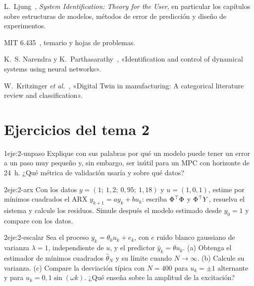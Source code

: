 \begin{lecturas}
\item L.~Ljung~\cite{ljung}, \emph{System Identification: Theory for the User}, en particular los capítulos sobre estructuras de modelos, métodos de error de predicción y diseño de experimentos.
\item MIT 6.435~\cite{mit6435}, temario y hojas de problemas.
\item K.~S. Narendra y K.~Parthasarathy~\cite{narendra}, «Identification and control of dynamical systems using neural networks».
\item W.~Kritzinger \emph{et al.}~\cite{kritzinger}, «Digital Twin in manufacturing: A categorical literature review and classification».
\end{lecturas}

\section*{Ejercicios del tema 2}

\begin{ejercicio}{1}{eje:2-unpaso}
Explique con sus palabras por qué un modelo puede tener un error a un paso muy pequeño y, sin embargo, ser inútil para un MPC con horizonte de 24~h. ¿Qué métrica de validación usaría y sobre qué datos?
\end{ejercicio}

\begin{ejercicio}{2}{eje:2-arx}
Con los datos $y=(1;\ 1{,}2;\ 0{,}95;\ 1{,}18)$ y $u=(1,0,1)$, estime por mínimos cuadrados el ARX $y_{k+1}=ay_k+bu_k$: escriba $\Phi^{\top}\Phi$ y $\Phi^{\top} Y$, resuelva el sistema y calcule los residuos. Simule después el modelo estimado desde $y_0=1$ y compare con los datos.
\end{ejercicio}

\begin{ejercicio}{2}{eje:2-escalar}
Sea el proceso $y_k=\theta_0u_k+e_k$, con $e$ ruido blanco gaussiano de varianza $\lambda=1$, independiente de $u$, y el predictor $\hat y_k=\theta u_k$. (a) Obtenga el estimador de mínimos cuadrados $\hat\theta_N$ y su límite cuando $N\to\infty$. (b) Calcule su varianza. (c) Compare la desviación típica con $N=400$ para $u_k=\pm1$ alternante y para $u_k=0{,}1\sin(\omega k)$. ¿Qué enseña sobre la amplitud de la excitación?
\end{ejercicio}

